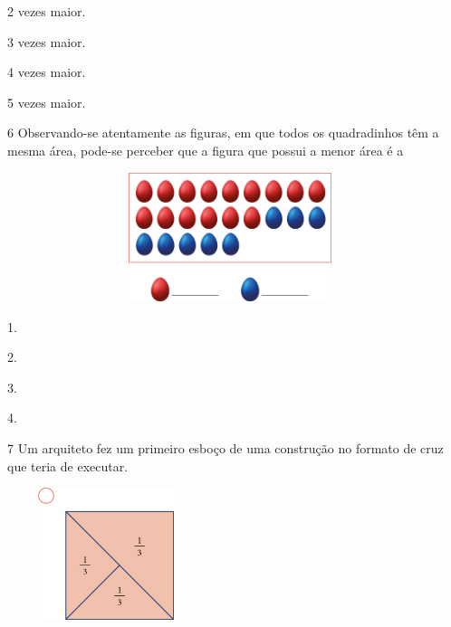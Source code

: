 \begin{mdframed}[linewidth=2pt,linecolor=salmao,roundcorner=2pt]
\begin{escolha}
\item
  2 vezes maior.
\item
  3 vezes maior.
\item
  4 vezes maior.
\item
  5 vezes maior.
\end{escolha}


\num{6} Observando-se atentamente as figuras, em que todos os quadradinhos têm a mesma área, pode-se perceber que a figura que possui a menor área é a

\includegraphics[width=5.12179in,height=1.48342in]{media/image65.png}

\begin{escolha}
\item
  1.
\item
  2.
\item
  3.
\item
  4.
\end{escolha}


\num{7} Um arquiteto fez um primeiro esboço de uma construção no formato de cruz
que teria de executar.

\includegraphics[width=2.27520in,height=1.51680in]{media/image66.png}



\end{mdframed}
